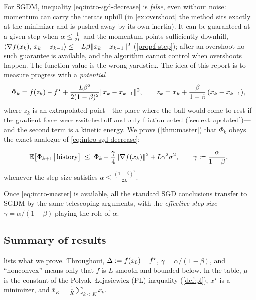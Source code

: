For SGDM, inequality \eqref{eq:intro-sgd-decrease} is \emph{false}, even without noise:
momentum can carry the iterate uphill (in \cref{ex:overshoot} the method sits exactly at
the minimizer and is pushed away by its own inertia). It can be guaranteed at a given
step when $\alpha\le\frac1{2L}$ and the momentum points sufficiently downhill,
$\langle \nabla f(x_k),\, x_k-x_{k-1}\rangle\le-L\beta\lVert x_k-x_{k-1}\rVert^2$ (\cref{prop:f-step}); after
an overshoot no such guarantee is available, and the algorithm cannot control when
overshoots happen. The function value is the wrong yardstick. The idea of this report is to measure progress with a \emph{potential}
\[
  \Phi_k=f(z_k)-f^\star+\frac{L\beta^2}{2(1-\beta)^2}\lVert x_k-x_{k-1}\rVert^2,
  \qquad z_k=x_k+\frac{\beta}{1-\beta}\,(x_k-x_{k-1}),
\]
where $z_k$ is an extrapolated point---the place where the ball would come to rest if the
gradient force were switched off and only friction acted (\cref{sec:extrapolated})---and the second term is a kinetic
energy. We prove (\cref{thm:master}) that $\Phi_k$ obeys the exact analogue of
\eqref{eq:intro-sgd-decrease}:
\begin{tcolorbox}[keybox]
\begin{equation}\label{eq:intro-master}
  \mathbb{E}\bigl[\Phi_{k+1}\,\big|\,\text{history}\bigr]\;\le\;\Phi_k
  -\frac{\gamma}{4}\lVert \nabla f(x_k)\rVert^2+L\gamma^2\sigma^2,
  \qquad \gamma:=\frac{\alpha}{1-\beta},
\end{equation}
\centering whenever the step size satisfies $\displaystyle\alpha\le\frac{(1-\beta)^2}{2L}$.
\end{tcolorbox}
\noindent Once \eqref{eq:intro-master} is available, all the standard SGD conclusions
transfer to SGDM by the same telescoping arguments, with the \emph{effective step size}
$\gamma=\alpha/(1-\beta)$ playing the role of $\alpha$.

\subsection{Summary of results}

 lists what we prove. Throughout, $\Delta:=f(x_0)-f^\star$, $\gamma=\alpha/(1-\beta)$,
and ``nonconvex'' means only that $f$ is $L$-smooth and bounded below. In the table,
$\mu$ is the constant of the Polyak--{\L}ojasiewicz (PL) inequality (\cref{def:pl}),
$x^\star$ is a minimizer, and $\bar x_K=\frac1K\sum_{k<K}x_k$.

